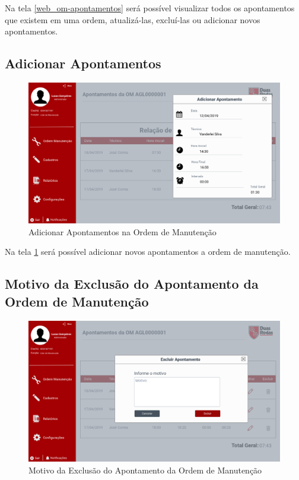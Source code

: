 Na tela \ref{web_om-apontamentos} será possível visualizar todos os apontamentos que existem em uma ordem, atualizá-las, excluí-las ou adicionar novos apontamentos.

\newpage
\subsection{Adicionar Apontamentos}

\begin{figure}[htb]
	\caption{\label{web_om-add-apontamento}Adicionar Apontamentos na Ordem de Manutenção}
	\begin{center}
		\includegraphics[scale=0.40]{./Figuras/web/om-add-apontamento.png}
	\end{center}
\end{figure}

Na tela \ref{web_om-add-apontamento} será possível adicionar novos apontamentos a ordem de manutenção.

\newpage
\subsection{Motivo da Exclusão do Apontamento da Ordem de Manutenção}

\begin{figure}[htb]
	\caption{\label{web_om-excluir-apontamento-motivo}Motivo da Exclusão do Apontamento da Ordem de Manutenção}
	\begin{center}
		\includegraphics[scale=0.40]{./Figuras/web/om-excluir-apontamento-motivo.png}
	\end{center}
\end{figure}

